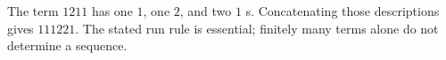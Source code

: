 The term $ 1211 $ has one $ 1 $, one $ 2 $, and two $ 1 $ s. Concatenating those descriptions gives $\boxed{111221}$. The stated run rule is essential; finitely many terms alone do not determine a sequence.
